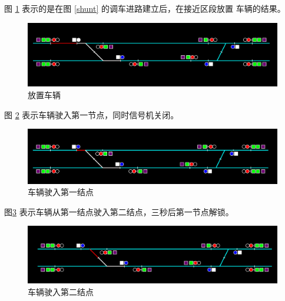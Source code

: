 图 \ref{jgred} 表示的是在图 \ref{shunt} 的调车进路建立后，在接近区段放置
车辆的结果。
\begin{figure}[htbp!]
  \centering
  \includegraphics[width=\textwidth]{figures/png/jgred.png}
  \caption{\label{jgred}放置车辆}
\end{figure}

图 \ref{d1sec} 表示车辆驶入第一节点，同时信号机关闭。
\begin{figure}[htbp!]
  \centering
  \includegraphics[width=\textwidth]{figures/png/d1sec.png}
  \caption{\label{d1sec}车辆驶入第一结点}
\end{figure}

图\ref{d3sec} 表示车辆从第一结点驶入第二结点，三秒后第一节点解锁。
\begin{figure}[htbp!]
  \centering
  \includegraphics[width=\textwidth]{figures/png/d3sec.png}
  \caption{\label{d3sec}车辆驶入第二结点}
\end{figure}